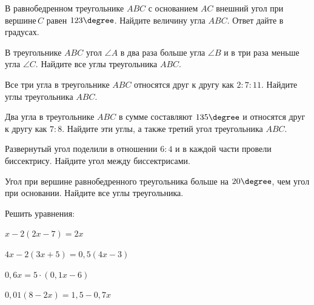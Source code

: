 %
%
%
\begin{homework}[number=2]
		\begin{listofex}
			\item В равнобедренном треугольнике \(ABC\) с основанием \(AC\) внешний угол при вершине \(C\) равен \(123 \degree \). Найдите величину угла \(ABC\). Ответ дайте в градусах.
			\item В треугольнике \( ABC \) угол \( \angle A \) в два раза больше угла \( \angle B \) и в три раза меньше угла \( \angle C \). Найдите все углы треугольника \( ABC \).
			\item Все три угла в треугольнике \( ABC \) относятся друг к другу как \( 2:7:11 \). Найдите углы треугольника \( ABC \).
			\item Два угла в треугольнике \( ABC \) в сумме составляют \( 135\degree \) и относятся друг к другу как \( 7:8 \). Найдите эти углы, а также третий угол треугольника \( ABC \).
			\item Развернутый угол поделили в отношении \( 6:4 \) и в каждой части провели биссектрису. Найдите угол между биссектрисами.
			\item Угол при вершине равнобедренного треугольника больше на \(20 \degree\), чем угол при основании. Найдите все углы треугольника.
			\item Решить уравнения:
			\begin{enumcols}[itemcolumns=2]
				\item \( x-2(2x-7)=2x \)
				\item \( 4x-2(3x+5)=0,5(4x-3) \)
				\item \( 0,6x=5 \cdot (0,1x-6) \)
				\item \( 0,01(8-2x)=1,5-0,7x \)
		\end{enumcols}
	\end{listofex}
\end{homework}
%
